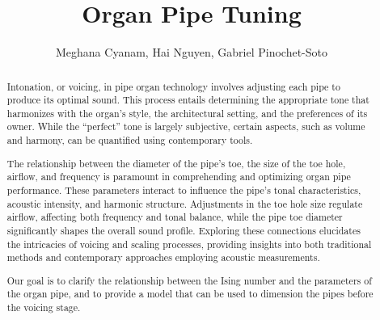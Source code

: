 \documentclass{psu-plan}
\title{Organ Pipe Tuning}
\author{ Meghana Cyanam, Hai Nguyen, Gabriel Pinochet-Soto }
\begin{document}
\maketitle

\begin{abstract}
    Intonation, or voicing, in pipe organ technology involves adjusting each
    pipe to produce its optimal sound.
    This process entails determining the appropriate tone that harmonizes with
    the organ’s style, the architectural setting, and the preferences of its
    owner.
    While the “perfect” tone is largely subjective, certain aspects, such as 
    volume and harmony, can be quantified using contemporary tools.
    
    The relationship between the diameter of the pipe’s toe, the size of the toe
    hole, airflow, and frequency is paramount in comprehending and optimizing
    organ pipe performance.
    These parameters interact to influence the pipe’s tonal characteristics,
    acoustic intensity, and harmonic structure. Adjustments in the toe hole size
    regulate airflow, affecting both frequency and tonal balance, while the pipe
    toe diameter significantly shapes the overall sound profile.
    Exploring these connections elucidates the intricacies of voicing and 
    scaling processes, providing insights into both traditional methods and
    contemporary approaches employing acoustic measurements.

    Our goal is to clarify the relationship between the Ising number and the
    parameters of the organ pipe, and to provide a model that can be used to
    dimension the pipes before the voicing stage.

\end{abstract}
\end{document}
